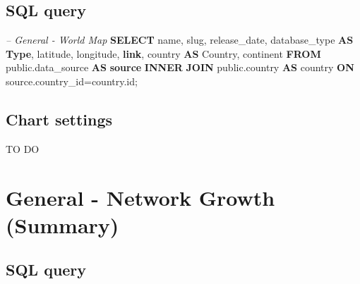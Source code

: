 \documentclass[]{book}
\newenvironment{Shaded}{\begin{snugshade}}{\end{snugshade}}
\newcommand{\KeywordTok}[1]{\textcolor[rgb]{0.13,0.29,0.53}{\textbf{#1}}}
\newcommand{\CommentTok}[1]{\textcolor[rgb]{0.56,0.35,0.01}{\textit{#1}}}
\newcommand{\NormalTok}[1]{#1}
\begin{document}
\subsection{SQL query}\label{sql-query-2}

\begin{Shaded}
\begin{Highlighting}[]
\CommentTok{--    General - World Map}
\KeywordTok{SELECT}\NormalTok{  name,}
\NormalTok{        slug,}
\NormalTok{        release_date,}
\NormalTok{        database_type }\KeywordTok{AS} \KeywordTok{Type}\NormalTok{,}
\NormalTok{        latitude,}
\NormalTok{        longitude,}
        \KeywordTok{link}\NormalTok{,}
\NormalTok{        country }\KeywordTok{AS}\NormalTok{ Country,}
\NormalTok{        continent}
\KeywordTok{FROM}\NormalTok{ public.data_source }\KeywordTok{AS} \KeywordTok{source} \KeywordTok{INNER} \KeywordTok{JOIN}\NormalTok{ public.country }
    \KeywordTok{AS}\NormalTok{ country }\KeywordTok{ON}\NormalTok{ source.country_id=country.id;}
\end{Highlighting}
\end{Shaded}

\subsection{Chart settings}\label{chart-settings-2}

TO DO

\section{General - Network Growth
(Summary)}\label{general---network-growth-summary}

\subsection{SQL query}\label{sql-query-3}
\end{document}
